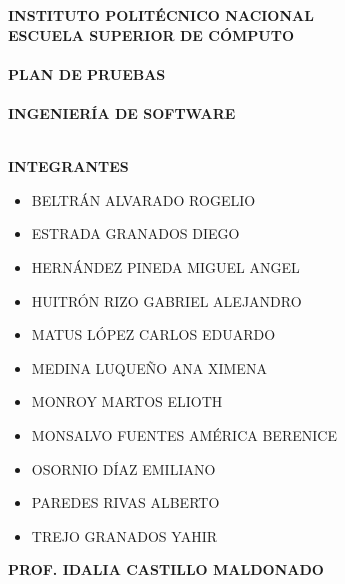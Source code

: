 \newpage
\begin{center}
\thispagestyle{empty}
\LARGE{\textsc {\textbf{INSTITUTO POLITÉCNICO NACIONAL}}}\\[0.5cm]
\Large{\textbf{ESCUELA SUPERIOR DE CÓMPUTO}}\\[0.7cm]
\vspace{0.5cm}
\LARGE{\textbf{\\PLAN DE PRUEBAS\\}}
\vspace{2cm}
\Large{\textbf{\\INGENIERÍA DE SOFTWARE}}
\vspace{2cm}
\end{center}
\Large{\textbf{\\INTEGRANTES}}\\
\large{
\begin{itemize}
    \item BELTRÁN ALVARADO ROGELIO
    \item ESTRADA GRANADOS DIEGO
    \item HERNÁNDEZ PINEDA MIGUEL ANGEL
    \item HUITRÓN RIZO GABRIEL ALEJANDRO
    \item MATUS LÓPEZ CARLOS EDUARDO
    \item MEDINA LUQUEÑO ANA XIMENA
    \item MONROY MARTOS ELIOTH
    \item MONSALVO FUENTES AMÉRICA BERENICE
    \item OSORNIO DÍAZ EMILIANO
    \item PAREDES RIVAS ALBERTO
    \item TREJO GRANADOS YAHIR
\end{itemize}
}
\vspace*{1cm}
\large{\textbf{PROF. IDALIA CASTILLO MALDONADO}}\\
\newpage